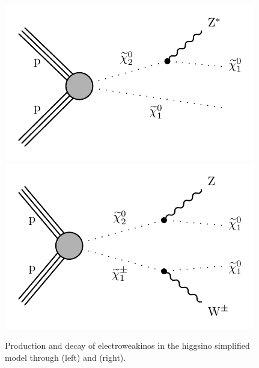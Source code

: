 \begin{figure}[h]
\centering
\includegraphics[width=0.48\linewidth]{plots/feynman_diagrams/gitTChiZ.pdf} \,
\includegraphics[width=0.48\linewidth]{plots/feynman_diagrams/gitTChiWZ.pdf}  \\
\caption[Signal Models Feynman Diagrams]{Production and decay of electroweakinos in the higgsino simplified model through \tchiz (left) and \tchiwz (right). }
\label{fig:signal-feynman-diagrams}
\end{figure}